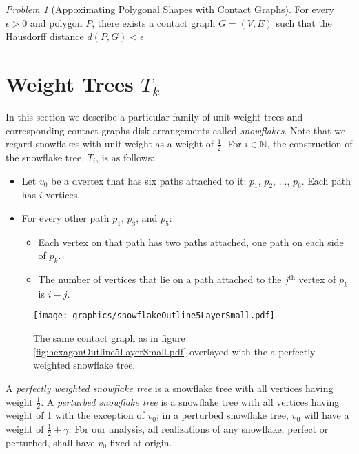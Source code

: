 \documentclass[10pt]{CSUNthesis}
\theoremstyle{plain}%
\theoremstyle{definition}
\theoremstyle{remark}
\newtheorem{prob}{Problem}
\newcommand{\bbN}{{\mathbb{N}}}
\begin{document}
\begin{prob}[Appoximating Polygonal Shapes with Contact Graphs]\label{problem:ApproxShapesWithContactGraphs}
For every $\epsilon >0$ and polygon $P$, there exists a contact graph $G = (V,E)$  such that the Hausdorff distance $d(P,G) < \epsilon$
\end{prob}\section{Weight Trees $T_k$}
In this section we describe a particular family of unit weight trees and corresponding contact graphs disk arrangements called \textit{snowflakes}.  
Note that we regard snowflakes with unit weight as a weight of $\frac{1}{2}$.  
For $i \in \bbN$, the construction of the snowflake tree, $T_i$, is as follows:
\begin{itemize}
\item Let $v_0$ be a dvertex that has six paths attached to it: $p_1$, $p_2$, $\dots$, $p_6$.  Each path has $i$ vertices.
\item For every other path $p_1$, $p_3$, and $p_5$: 
	\begin{itemize}
		\item 	Each vertex on that path has two paths attached, one path on each side of $p_k$.
		\item	The number of vertices that lie on a path attached to the $j^\text{th}$ vertex of $p_k$ is $i-j$.
	\end{itemize}
\end{itemize}

\begin{figure}[!htbp]
\begin{center}
\texttt{[image: graphics/snowflakeOutline5LayerSmall.pdf]}
\caption{The same contact graph as in figure \ref{fig:hexagonOutline5LayerSmall.pdf} overlayed with the a perfectly weighted snowflake tree.}\label{fig:snowflakeOutline5LayerSmall.pdf}
\end{center}
\end{figure}

A \textit{perfectly weighted snowflake tree} is a snowflake tree with all vertices having weight $\frac{1}{2}$.   
A \textit{perturbed snowflake tree} is a snowflake tree with all vertices having weight of 1 with the exception of $v_0$;  in a perturbed snowflake tree, $v_0$ will have a weight of $\frac{1}{2} + \gamma$.  
For our analysis, all realizations of any snowflake, perfect or perturbed, shall have $v_0$ fixed at origin.  
\end{document}
